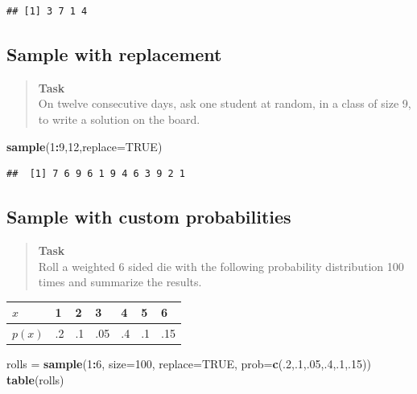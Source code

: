 \documentclass[
]{book}
\newenvironment{Shaded}{\begin{snugshade}}{\end{snugshade}}
\newcommand{\AttributeTok}[1]{\textcolor[rgb]{0.13,0.29,0.53}{#1}}
\newcommand{\ConstantTok}[1]{\textcolor[rgb]{0.56,0.35,0.01}{#1}}
\newcommand{\DecValTok}[1]{\textcolor[rgb]{0.00,0.00,0.81}{#1}}
\newcommand{\FunctionTok}[1]{\textcolor[rgb]{0.13,0.29,0.53}{\textbf{#1}}}
\newcommand{\NormalTok}[1]{#1}
\newcommand{\OtherTok}[1]{\textcolor[rgb]{0.56,0.35,0.01}{#1}}
\newcommand{\SpecialCharTok}[1]{\textcolor[rgb]{0.81,0.36,0.00}{\textbf{#1}}}
\theoremstyle{definition}
\theoremstyle{definition}
\theoremstyle{definition}
\theoremstyle{definition}
\theoremstyle{remark}
\begin{document}
\begin{verbatim}
## [1] 3 7 1 4
\end{verbatim}

\subsection*{Sample with replacement}\label{sample-with-replacement}

\begin{quote}
\textbf{Task}\\
On twelve consecutive days, ask one student at random, in a class of size 9, to write a solution on the board.
\end{quote}

\begin{Shaded}
\begin{Highlighting}[]
\FunctionTok{sample}\NormalTok{(}\DecValTok{1}\SpecialCharTok{:}\DecValTok{9}\NormalTok{,}\DecValTok{12}\NormalTok{,}\AttributeTok{replace=}\ConstantTok{TRUE}\NormalTok{)}
\end{Highlighting}
\end{Shaded}

\begin{verbatim}
##  [1] 7 6 9 6 1 9 4 6 3 9 2 1
\end{verbatim}

\subsection*{Sample with custom probabilities}\label{sample-with-custom-probabilities}

\begin{quote}
\textbf{Task}\\
Roll a weighted 6 sided die with the following probability distribution 100 times and summarize the results.
\end{quote}

\begin{longtable}[]{@{}lllllll@{}}
\toprule\noalign{}
\(x\) & 1 & 2 & 3 & 4 & 5 & 6 \\
\midrule\noalign{}
\endhead
\bottomrule\noalign{}
\endlastfoot
\(p(x)\) & .2 & .1 & .05 & .4 & .1 & .15 \\
\end{longtable}

\begin{Shaded}
\begin{Highlighting}[]
\NormalTok{rolls }\OtherTok{=} \FunctionTok{sample}\NormalTok{(}\DecValTok{1}\SpecialCharTok{:}\DecValTok{6}\NormalTok{,}
               \AttributeTok{size=}\DecValTok{100}\NormalTok{,}
               \AttributeTok{replace=}\ConstantTok{TRUE}\NormalTok{,}
               \AttributeTok{prob=}\FunctionTok{c}\NormalTok{(.}\DecValTok{2}\NormalTok{,.}\DecValTok{1}\NormalTok{,.}\DecValTok{05}\NormalTok{,.}\DecValTok{4}\NormalTok{,.}\DecValTok{1}\NormalTok{,.}\DecValTok{15}\NormalTok{))}
\FunctionTok{table}\NormalTok{(rolls)}
\end{Highlighting}
\end{Shaded}
\end{document}
